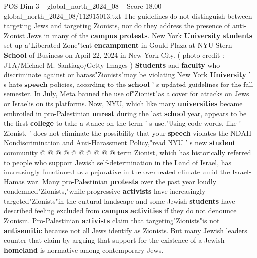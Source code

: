 \begin{textsample}{POS Dim 3 – global\_north\_2024\_08 – Score 18.00 – global\_north\_2024\_08/112915013.txt}  \label{ex:f3_pos_144}
The guidelines do not distinguish between targeting Jews and targeting Zionists, nor do they address the presence of anti-Zionist Jews in many of the \textbf{campus} \textbf{protests}.
New York \textbf{University} \textbf{students} set up a"Liberated Zone"tent \textbf{encampment} in Gould Plaza at NYU Stern \textbf{School} of Business on April 22, 2024 in New York City. ( photo credit : JTA/Michael M.
Santiago/Getty Images ) \textbf{Students} and \textbf{faculty} who discriminate against or harass"Zionists"may be violating New York \textbf{University} ' s hate \textbf{speech} policies, according to the \textbf{school} ' s updated guidelines for the fall semester.
In July, Meta banned the use of"Zionist"as a cover for attacks on Jews or Israelis on its platforms.
Now, NYU, which like many \textbf{universities} became embroiled in pro-Palestinian \textbf{unrest} during the last \textbf{school} year, appears to be the first \textbf{college} to take a stance on the term ' s use."Using code words, like ' Zionist, ' does not eliminate the possibility that your \textbf{speech} violates the NDAH Nondiscrimination and Anti-Harassment Policy,"read NYU ' s new \textbf{student} community @ @ @ @ @ @ @ @ @ @ term Zionist, which has historically referred to people who support Jewish self-determination in the Land of Israel, has increasingly functioned as a pejorative in the overheated climate amid the Israel-Hamas war.
Many pro-Palestinian \textbf{protests} over the past year loudly condemned"Zionists,"while progressive \textbf{activists} have increasingly targeted"Zionists"in the cultural landscape and some Jewish \textbf{students} have described feeling excluded from \textbf{campus} \textbf{activities} if they do not denounce Zionism.
Pro-Palestinian \textbf{activists} claim that targeting"Zionists"is not \textbf{antisemitic} because not all Jews identify as Zionists.
But many Jewish leaders counter that claim by arguing that support for the existence of a Jewish \textbf{homeland} is normative among contemporary Jews.

\end{textsample}
